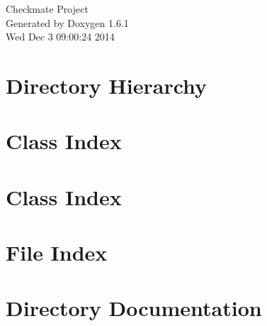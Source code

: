 \documentclass[a4paper]{book}
\begin{document}
\hypersetup{pageanchor=false}
\begin{titlepage}
\vspace*{7cm}
\begin{center}
{\Large Checkmate Project }\\
\vspace*{1cm}
{\large Generated by Doxygen 1.6.1}\\
\vspace*{0.5cm}
{\small Wed Dec 3 09:00:24 2014}\\
\end{center}
\end{titlepage}
\clearemptydoublepage
{}
\tableofcontents
\clearemptydoublepage
{}
\hypersetup{pageanchor=true}
\chapter{Directory Hierarchy}

\chapter{Class Index}

\chapter{Class Index}

\chapter{File Index}

\chapter{Directory Documentation}






\end{document}
